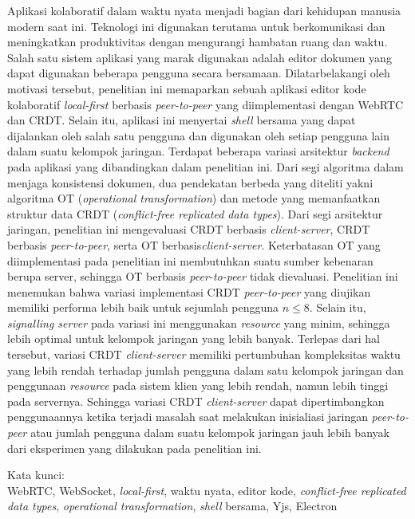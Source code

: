 \noindent Aplikasi kolaboratif dalam waktu nyata menjadi bagian dari kehidupan manusia modern saat ini. Teknologi ini digunakan terutama untuk berkomunikasi dan meningkatkan produktivitas dengan mengurangi hambatan ruang dan waktu. Salah satu sistem aplikasi yang marak digunakan adalah editor dokumen yang dapat digunakan beberapa pengguna secara bersamaan. Dilatarbelakangi oleh motivasi tersebut, penelitian ini memaparkan sebuah aplikasi editor kode kolaboratif \textit{local-first} berbasis \textit{peer-to-peer} yang diimplementasi dengan WebRTC dan CRDT. Selain itu, aplikasi ini menyertai \textit{shell} bersama yang dapat dijalankan oleh salah satu pengguna dan digunakan oleh setiap pengguna lain dalam suatu kelompok jaringan. Terdapat beberapa variasi arsitektur \textit{backend} pada aplikasi yang dibandingkan dalam penelitian ini. Dari segi algoritma dalam menjaga konsistensi dokumen, dua pendekatan berbeda yang diteliti yakni algoritma OT (\textit{operational transformation}) dan metode yang memanfaatkan struktur data CRDT (\textit{conflict-free replicated data types}). Dari segi arsitektur jaringan, penelitian ini mengevaluasi CRDT berbasis \textit{client-server}, CRDT berbasis \textit{peer-to-peer}, serta OT berbasis\textit{client-server}. Keterbatasan OT yang diimplementasi pada penelitian ini membutuhkan suatu sumber kebenaran berupa server, sehingga OT berbasis \textit{peer-to-peer} tidak dievaluasi. Penelitian ini menemukan bahwa variasi implementasi CRDT \textit{peer-to-peer} yang diujikan memiliki performa lebih baik untuk sejumlah pengguna $n \leq 8$. Selain itu, \textit{signalling server} pada variasi ini menggunakan \textit{resource} yang minim, sehingga lebih optimal untuk kelompok jaringan yang lebih banyak. Terlepas dari hal tersebut, variasi CRDT \textit{client-server} memiliki pertumbuhan kompleksitas waktu yang lebih rendah terhadap jumlah pengguna dalam satu kelompok jaringan dan penggunaan \textit{resource} pada sistem klien yang lebih rendah, namun lebih tinggi pada servernya. Sehingga variasi CRDT \textit{client-server} dapat dipertimbangkan penggunaannya ketika terjadi masalah saat melakukan inisialiasi jaringan \textit{peer-to-peer} atau jumlah pengguna dalam suatu kelompok jaringan jauh lebih banyak dari eksperimen yang dilakukan pada penelitian ini.\\

\vspace*{0.2cm}

\noindent Kata kunci: \\ WebRTC, WebSocket, \textit{local-first}, waktu nyata, editor kode, \textit{conflict-free replicated data types}, \textit{operational transformation}, \textit{shell} bersama, Yjs, Electron \\

\newpage
